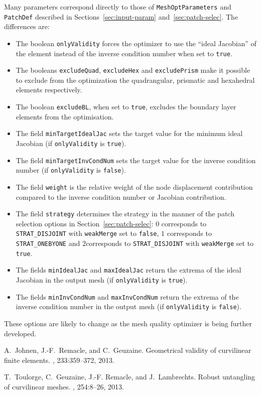 \documentclass[12pt,a4paper,a4wide]{article}
\begin{document}
Many parameters correspond directly to those of
\texttt{MeshOptParameters} and \texttt{PatchDef} described in
Sections~\ref{sec:input-param} and~\ref{sec:patch-selec}. The
differences are:
\begin{itemize}
\item The boolean \texttt{onlyValidity} forces the optimizer to
use the ``ideal Jacobian'' of the element instead of the inverse
condition number when set to \texttt{true}.
\item The booleans \texttt{excludeQuad}, \texttt{excludeHex} and
\texttt{excludePrism} make it possible to exclude from the
optimization the quadrangular, prismatic and hexahedral elements
respectively.
\item The boolean \texttt{excludeBL}, when set to \texttt{true},
excludes the boundary layer elements from the optimisation.
\item The field \texttt{minTargetIdealJac} sets the target value
for the minimum ideal Jacobian (if \texttt{onlyValidity} is
\texttt{true}).
\item The field \texttt{minTargetInvCondNum} sets the target
value for the inverse condition number (if \texttt{onlyValidity}
is \texttt{false}).
\item The field \texttt{weight} is the relative weight of the node
displacement contribution compared to the inverse condition number
or Jacobian contribution.
\item The field \texttt{strategy} determines the strategy in the
manner of the patch selection options in
Section~\ref{sec:patch-selec}: $0$ corresponds to
\texttt{STRAT\_DISJOINT} with \texttt{weakMerge} set to
\texttt{false}, $1$ corresponds to \texttt{STRAT\_ONEBYONE}
and $2$corresponds to \texttt{STRAT\_DISJOINT} with
\texttt{weakMerge} set to \texttt{true}.
\item The fields \texttt{minIdealJac} and \texttt{maxIdealJac}
return the extrema of the ideal Jacobian in the output mesh
(if \texttt{onlyValidity} is \texttt{true}).
\item The fields \texttt{minInvCondNum} and
\texttt{maxInvCondNum} return the extrema of the inverse condition
number in the output mesh (if \texttt{onlyValidity} is
\texttt{false}).
\end{itemize}

These options are likely to change as the mesh quality optimizer
is being further developed.

%
%


\begin{thebibliography}{2}

A.~Johnen, J.-F.~Remacle, and C.~Geuzaine.
\newblock Geometrical validity of curvilinear finite elements.
, 233:359--372, 2013.

T.~Toulorge, C.~Geuzaine, J.-F. Remacle, and J.~Lambrechts.
\newblock Robust untangling of curvilinear meshes.
, 254:8--26, 2013.

\end{thebibliography}
\end{document}
